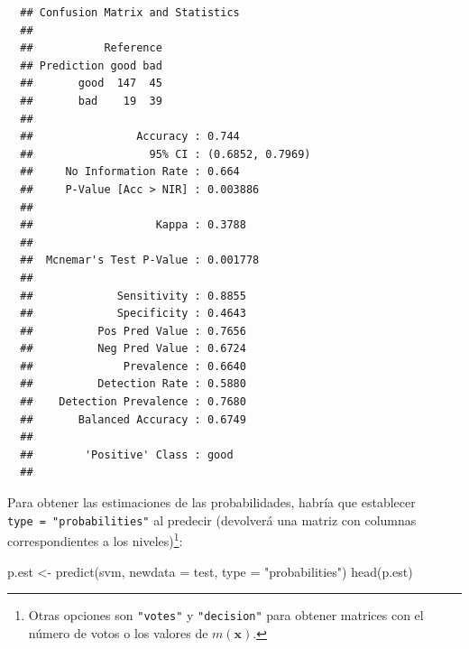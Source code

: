 \documentclass[
]{book}
\newenvironment{Shaded}{\begin{snugshade}}{\end{snugshade}}
\newcommand{\AttributeTok}[1]{\textcolor[rgb]{0.77,0.63,0.00}{#1}}
\newcommand{\FunctionTok}[1]{\textcolor[rgb]{0.00,0.00,0.00}{#1}}
\newcommand{\NormalTok}[1]{#1}
\newcommand{\OtherTok}[1]{\textcolor[rgb]{0.56,0.35,0.01}{#1}}
\newcommand{\SpecialCharTok}[1]{\textcolor[rgb]{0.00,0.00,0.00}{#1}}
\newcommand{\StringTok}[1]{\textcolor[rgb]{0.31,0.60,0.02}{#1}}
\theoremstyle{break}
\theoremstyle{nonumberplain}
\begin{document}
\begin{Shaded}
\end{Shaded}

\begin{verbatim}
  ## Confusion Matrix and Statistics
  ## 
  ##           Reference
  ## Prediction good bad
  ##       good  147  45
  ##       bad    19  39
  ##                                           
  ##                Accuracy : 0.744           
  ##                  95% CI : (0.6852, 0.7969)
  ##     No Information Rate : 0.664           
  ##     P-Value [Acc > NIR] : 0.003886        
  ##                                           
  ##                   Kappa : 0.3788          
  ##                                           
  ##  Mcnemar's Test P-Value : 0.001778        
  ##                                           
  ##             Sensitivity : 0.8855          
  ##             Specificity : 0.4643          
  ##          Pos Pred Value : 0.7656          
  ##          Neg Pred Value : 0.6724          
  ##              Prevalence : 0.6640          
  ##          Detection Rate : 0.5880          
  ##    Detection Prevalence : 0.7680          
  ##       Balanced Accuracy : 0.6749          
  ##                                           
  ##        'Positive' Class : good            
  ## 
\end{verbatim}

Para obtener las estimaciones de las probabilidades, habría que establecer
\texttt{type\ =\ "probabilities"} al predecir (devolverá una matriz con columnas
correspondientes a los niveles)\footnote{Otras opciones son \texttt{"votes"} y \texttt{"decision"} para obtener matrices con el número de votos o los valores de \(m(\mathbf{x})\).}:

\begin{Shaded}
\begin{Highlighting}[]
\NormalTok{p.est }\OtherTok{\textless{}{-}} \FunctionTok{predict}\NormalTok{(svm, }\AttributeTok{newdata =}\NormalTok{ test, }\AttributeTok{type =} \StringTok{"probabilities"}\NormalTok{)}
\FunctionTok{head}\NormalTok{(p.est)}
\end{Highlighting}
\end{Shaded}
\end{document}
